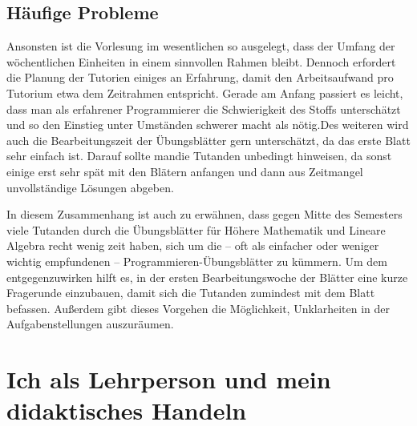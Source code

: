 \documentclass[%
fontsize=12pt,
paper=a4,
oneside,
DIV=13,
BCOR=0cm,
pagesize=automedia,
parskip=false,
headings=normal,
titlepage=true%
]{scrartcl}
\begin{document}
\subsection{H\"aufige Probleme}
Ansonsten ist die Vorlesung im wesentlichen so ausgelegt, dass der Umfang der
w\"ochentlichen Einheiten in einem sinnvollen Rahmen bleibt. Dennoch erfordert
die Planung der Tutorien einiges an Erfahrung, damit den Arbeitsaufwand pro
Tutorium etwa dem Zeitrahmen entspricht. Gerade am Anfang passiert es leicht,
dass man als erfahrener Programmierer die Schwierigkeit des Stoffs
untersch\"atzt und so den Einstieg unter Umst\"anden schwerer macht als
n\"otig.Des weiteren wird auch die Bearbeitungszeit der \"Ubungsbl\"atter gern
untersch\"atzt, da das erste Blatt sehr einfach ist. Darauf sollte mandie
Tutanden unbedingt hinweisen, da sonst einige erst sehr sp\"at mit den
Bl\"atern anfangen und dann aus Zeitmangel unvollst\"andige L\"osungen abgeben.

In diesem Zusammenhang ist auch zu erw\"ahnen, dass gegen Mitte des Semesters
viele Tutanden durch die \"Ubungsbl\"atter f\"ur H\"ohere Mathematik und
Lineare Algebra recht wenig zeit haben, sich um die -- oft als einfacher oder
weniger wichtig empfundenen -- Programmieren-\"Ubungsbl\"atter zu k\"ummern. Um
dem entgegenzuwirken hilft es, in der ersten Bearbeitungswoche der Bl\"atter
eine kurze Fragerunde einzubauen, damit sich die Tutanden zumindest mit dem
Blatt befassen. Au\ss{}erdem gibt dieses Vorgehen die M\"oglichkeit,
Unklarheiten in der Aufgabenstellungen auszur\"aumen.

\section{Ich als Lehrperson und mein didaktisches Handeln}
\end{document}
